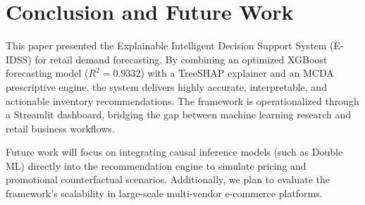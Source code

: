 \documentclass[conference]{IEEEtran}
\begin{document}
\section{Conclusion and Future Work}
This paper presented the Explainable Intelligent Decision Support System (E-IDSS) for retail demand forecasting. By combining an optimized XGBoost forecasting model ($R^2 = 0.9332$) with a TreeSHAP explainer and an MCDA prescriptive engine, the system delivers highly accurate, interpretable, and actionable inventory recommendations. The framework is operationalized through a Streamlit dashboard, bridging the gap between machine learning research and retail business workflows.

Future work will focus on integrating causal inference models (such as Double ML) directly into the recommendation engine to simulate pricing and promotional counterfactual scenarios. Additionally, we plan to evaluate the framework's scalability in large-scale multi-vendor e-commerce platforms.
\end{document}
